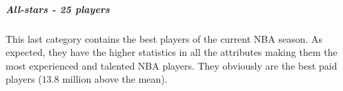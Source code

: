 \subparagraph{All-stars - 25 players}This last category contains the best players of the current NBA season. As expected, they have the higher statistics in all the attributes making them the most experienced and talented NBA players. They obviously are the best paid players ($13.8$ million above the mean).